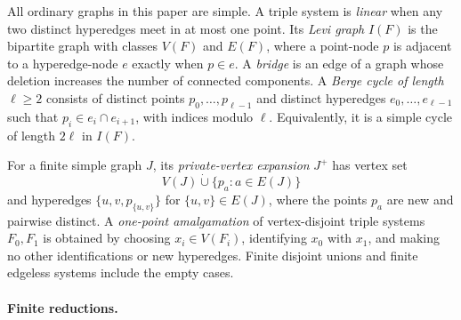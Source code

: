 \documentclass[a4paper,11pt,reqno]{amsart}
\theoremstyle{plain}
\theoremstyle{definition}
\theoremstyle{remark}
\begin{document}
All ordinary graphs in this paper are simple. A triple system is \emph{linear} when any two distinct hyperedges meet in at most one point. Its \emph{Levi graph} \(I(F)\) is the bipartite graph with classes \(V(F)\) and \(E(F)\), where a point-node \(p\) is adjacent to a hyperedge-node \(e\) exactly when \(p\in e\). A \emph{bridge} is an edge of a graph whose deletion increases the number of connected components. A \emph{Berge cycle of length} \(\ell\ge2\) consists of distinct points \(p_0,\ldots,p_{\ell-1}\) and distinct hyperedges \(e_0,\ldots,e_{\ell-1}\) such that \(p_i\in e_i\cap e_{i+1}\), with indices modulo \(\ell\). Equivalently, it is a simple cycle of length \(2\ell\) in \(I(F)\).

For a finite simple graph \(J\), its \emph{private-vertex expansion} \(J^+\) has vertex set
\[
V(J)\mathbin{\dot\cup}\{p_a:a\in E(J)\}
\]
and hyperedges \(\{u,v,p_{\{u,v\}}\}\) for \(\{u,v\}\in E(J)\), where the points \(p_a\) are new and pairwise distinct. A \emph{one-point amalgamation} of vertex-disjoint triple systems \(F_0,F_1\) is obtained by choosing \(x_i\in V(F_i)\), identifying \(x_0\) with \(x_1\), and making no other identifications or new hyperedges. Finite disjoint unions and finite edgeless systems include the empty cases.

\paragraph{Finite reductions.}\label{finite-reductions}
\end{document}
